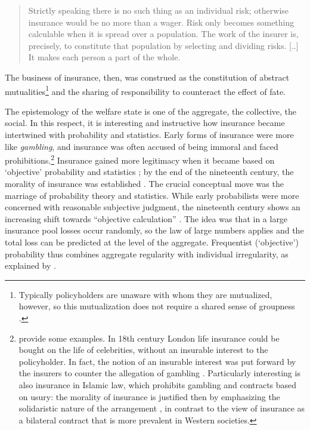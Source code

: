 \documentclass[11pt]{article} %
\begin{document}
\begin{quote}
Strictly speaking there is no such thing as an individual risk; otherwise insurance would be no more than a wager. Risk only becomes something calculable when it is spread over a population. The work of the insurer is, precisely, to constitute that population by selecting and dividing risks. [..] It makes each person a part of the whole.
\end{quote}
The business of insurance, then, was construed as the constitution of abstract mutualities\footnote{Typically policyholders are unaware with whom they are mutualized, however, so this mutualization does not require a shared sense of groupness \citep{krippner2022person}.} \citep{lehtonen2011forms} and the sharing of responsibility to counteract the effect of fate.


The epistemology of the welfare state is one of the aggregate, the collective, the social. In this respect, it is interesting and instructive how insurance became intertwined with probability and statistics.
Early forms of insurance were more like \textit{gambling}, and insurance was often accused of being immoral and faced prohibitions.\footnote{\citet{cooper2009probability} provide some examples. In 18th century London life insurance could be bought on the life of celebrities, without an insurable interest to the policyholder. In fact, the notion of an insurable interest was put forward by the insurers to counter the allegation of gambling \citep{baker1996genealogy,mcfall2018or}. Particularly interesting is also insurance in Islamic law, which prohibits gambling and contracts based on usury: the morality of insurance is justified then by emphasizing the solidaristic nature of the arrangement \citep{baker2002risk}, in contrast to the view of insurance as a bilateral contract that is more prevalent in Western societies.} Insurance gained more legitimacy when it became based on `objective' probability and statistics \citep[p.\@\xspace 162ff]{daston2023classical}; by the end of the nineteenth century, the morality of insurance was established \citep{baker1996genealogy}.
The crucial conceptual move was the marriage of probability theory and statistics. While early probabilists were more concerned with reasonable subjective judgment, the nineteenth century shows an increasing shift towards ``objective calculation'' \citep{mcfall2011good}. The idea was that in a large insurance pool losses occur randomly, so the law of large numbers applies and the total loss can be predicted at the level of the aggregate. Frequentist (`objective') probability thus combines aggregate regularity with individual irregularity, as explained by \citet[p.\@\xspace 4]{Venn1876}.
\end{document}
